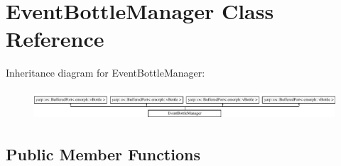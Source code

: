 \hypertarget{classEventBottleManager}{\section{Event\-Bottle\-Manager Class Reference}
\label{classEventBottleManager}
}
Inheritance diagram for Event\-Bottle\-Manager\-:\begin{figure}[H]
\begin{center}
\leavevmode
\includegraphics[height=1.106719cm]{classEventBottleManager}
\end{center}
\end{figure}
\subsection*{Public Member Functions}
